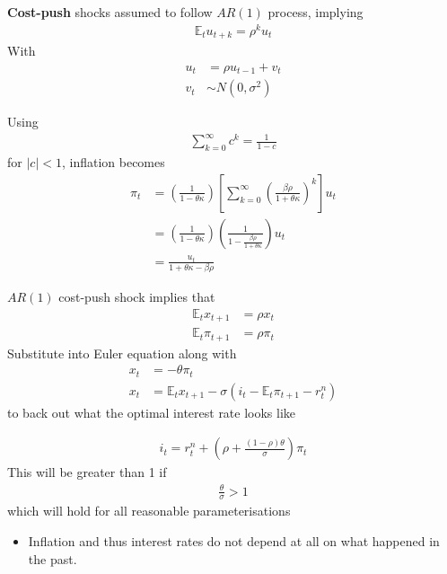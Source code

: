 \documentclass{beamer}
\begin{document}
\begin{frame}
  \textbf{Cost-push} shocks assumed to follow $AR(1)$ process, implying
  \begin{align}
    \mathbb{E}_tu_{t+k}=\rho^ku_t
  \end{align}
  \medskip
  With 
  \begin{align}
 u_t&=\rho u_{t-1} + v_t \\ \nonumber v_t &\sim N(0,\sigma^2) 
\end{align}
\end{frame}

\begin{frame}
  Using
  \begin{align}
    \sum_{k=0}^{\infty}c^k=\frac{1}{1-c}
  \end{align}
for $|c|<1$, inflation becomes
\begin{align}
  \pi_t &= \left( \frac{1}{1-\theta\kappa} \right) \left[ \sum_{k=0}^{\infty} \left( \frac{\beta\rho}{1+\theta\kappa} \right)^k \right]u_t\\
  &= \left( \frac{1}{1-\theta\kappa} \right) \left( \frac{1}{1-\frac{\beta\rho}{1+\theta\kappa}} \right) u_t\\
  &= \frac{u_t}{1+\theta\kappa-\beta\rho}
\end{align}
\end{frame}
\begin{frame}
  $AR(1)$ cost-push shock implies that 
\begin{align}
  \mathbb{E}_tx_{t+1} &= \rho x_t\\
  \mathbb{E}_t \pi_{t+1} &= \rho \pi_t  
\end{align}
\medskip
Substitute into Euler equation along with
\begin{align}
  x_t&=-\theta\pi_t\\ \nonumber
  x_t&=\mathbb{E}_t x_{t+1}-\sigma(i_t-\mathbb{E}_t \pi_{t+1}-r_t^n)
\end{align}
\medskip
to back out what the optimal interest rate looks like  
\end{frame}

\begin{frame}
  \begin{align}
  i_t=r_t^n+ \left( \rho + \frac{(1-\rho)\theta}{\sigma} \right) \pi_t
\end{align}
\medskip
This will be greater than 1 if 
\begin{align}
 \frac{\theta}{\sigma}>1 
\end{align}
\medskip
 which will hold for all reasonable parameterisations
\begin{itemize}
   \item Inflation and thus interest rates do not depend at all on what happened in the past.
 \end{itemize} 
\end{frame}
\end{document}
